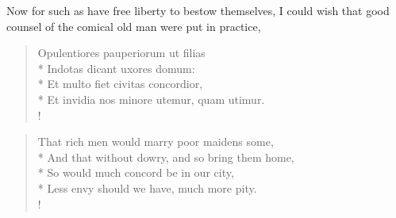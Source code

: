 Now for such as have free liberty to bestow themselves, I could wish
that good counsel of the comical old man were put in practice,
%
\begin{latin}%
\begin{verse}%
Opulentiores pauperiorum ut filias\\*
Indotas dicant uxores domum:\\*
Et multo fiet civitas concordior,\\*
Et invidia nos minore utemur, quam utimur.\\!
\end{verse}%
\end{latin}%
\translationrule%
\begin{verse}%
That rich men would marry poor maidens some,\\*
And that without dowry, and so bring them home,\\*
So would much concord be in our city,\\*
Less envy should we have, much more pity.\\!
\end{verse}%
%

